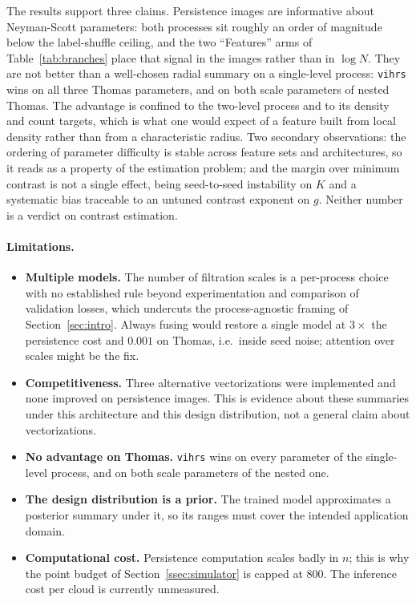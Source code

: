 \documentclass[11pt,a4paper]{article}
\begin{document}
The results support three claims. Persistence images are informative about
Neyman-Scott parameters: both processes sit roughly an order of magnitude below
the label-shuffle ceiling, and the two ``Features'' arms of
Table~\ref{tab:branches} place that signal in the images rather than in
$\log N$. They are not better than a well-chosen radial summary on a
single-level process: \texttt{vihrs} wins on all three Thomas parameters, and on
both scale parameters of nested Thomas. The advantage is confined to the
two-level process and to its density and count targets, which is what one would
expect of a feature built from local density rather than from a characteristic
radius. Two secondary observations: the ordering of parameter difficulty is
stable across feature sets and architectures, so it reads as a property of the
estimation problem; and the margin over minimum contrast is not a single effect,
being seed-to-seed instability on $K$ and a systematic bias traceable to an
untuned contrast exponent on $g$. Neither number is a verdict on contrast
estimation.

\paragraph{Limitations.}
\begin{itemize}[leftmargin=*,itemsep=2pt]
    \item \textbf{Multiple models.} The number of filtration scales is a
    per-process choice with no established rule beyond experimentation and
    comparison of validation losses, which undercuts the process-agnostic
    framing of Section~\ref{sec:intro}. Always fusing would restore a single
    model at $3\times$ the persistence cost and $0.001$ on Thomas, i.e.\ inside
    seed noise; attention over scales might be the fix.
    \item \textbf{Competitiveness.} Three alternative vectorizations were
    implemented and none improved on persistence images. This is evidence about
    these summaries under this architecture and this design distribution, not a
    general claim about vectorizations.
    \item \textbf{No advantage on Thomas.} \texttt{vihrs} wins on every
    parameter of the single-level process, and on both scale parameters of the
    nested one.
    \item \textbf{The design distribution is a prior.} The trained model
    approximates a posterior summary under it, so its ranges must cover the
    intended application domain.
    \item \textbf{Computational cost.} Persistence computation scales badly in
    $n$; this is why the point budget of Section~\ref{ssec:simulator} is capped
    at 800. The inference cost per cloud is currently unmeasured.
\end{itemize}
\end{document}
